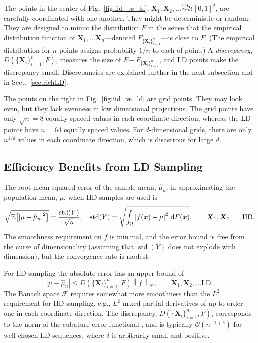 \documentclass[11pt]{NSFamsart}
\DeclareMathOperator{\std}{std}
\newcommand{\bbE}{\mathbb{E}}
\newcommand{\bx}{{\boldsymbol{x}}}
\newcommand{\bX}{{\boldsymbol{X}}}
\def\dif{\textup{d}}
\newcommand{\cx}{{\Omega}}
\newcommand{\calf}{{\mathcal{F}}}
\newcommand{\calu}{{\mathcal{U}}}
\def\abs#1{\ensuremath{\left \lvert #1 \right \rvert}}
\newcommand{\norm}[2][{}]{\ensuremath{\left \lVert #2 \right \rVert}_{#1}}
\newcommand{\Order}{\mathcal{O}}
\newcommand{\hmu}{\hat{\mu}}
\newcommand{\LDSim}{\overset{\text{LD}}{\sim}}
\begin{document}
The  points in the center of Fig.\ \ref{fig:iid_vs_ld}, $\bX_1, \bX_2,  \ldots \LDSim \calu[0,1]^2$, are carefully coordinated with one another.  They might be deterministic or random.  They are designed to mimic the distribution $F$  in the sense that the empirical distribution function of  $\bX_1, \ldots \bX_n$---denoted $F_{\{\bX_i\}_{i=1}^n}$---is close to $F$.  (The empirical distribution for $n$  points assigns probability $1/n$ to each of point.)  A \emph{discrepancy}, $D(\{\bX_i\}_{i=1}^n, F)$, measures the size of $F - F_{\{\bX_i\}_{i=1}^n}$, and LD points make the discrepancy small.  Discrepancies are explained further in the next subsection and in Sect.\ \ref{sec:richLD}.

The points on the right in Fig.\ \ref{fig:iid_vs_ld} are grid points. They may look even, but they lack evenness in low dimensional projections.  The grid points have only $\sqrt{n} = 8$ equally spaced values in each coordinate direction, whereas the LD points have $n=64$ equally spaced values.  For $d$-dimensional grids, there are only $n^{1/d}$ values in each coordinate direction, which is disastrous for  large $d$.

\subsection{Efficiency Benefits from LD Sampling}
The root mean squared error of the sample mean, $\hmu_n$, in approximating the population mean, $\mu$, when IID samples are used is 
\begin{equation}
    \sqrt{\bbE\bigl[\abs{\mu - \hmu_n}^2\bigr]} = \frac{\std(Y)}{\sqrt{n}},  \quad \std(Y) = \sqrt{\int_{\cx} \abs{f(\bx) - \mu}^2 \, \dif F(\bx)}, \qquad \bX_1, \bX_2, \ldots \text{IID}.
\end{equation}
The smoothness requirement on $f$ is minimal, and the error bound is free from the curse of dimensionality (assuming that $\std(Y)$ does not explode with dimension), but the convergence rate is modest.  

For LD sampling the absolute error has an upper bound of
\begin{equation} \label{eq:KH}
    \abs{\mu - \hmu_n} \le D(\{\bX_i\}_{i=1}^n, F) \norm[\calf]{f},  \qquad \bX_1, \bX_2, \ldots \text{LD}.
\end{equation}
The Banach space $\calf$ requires somewhat more smoothness than the $L^2$ requirement for IID sampling, e.g., $L^2$ mixed partial derivatives of up to order one in each coordinate direction. The discrepancy,  $D(\{\bX_i\}_{i=1}^n, F)$, corresponds to the norm of the cubature error functional \cite{Hic97a}, and is typically $\Order(n^{-1 + \delta})$ for well-chosen LD sequences, where $\delta$ is arbitrarily small and positive.
\end{document}
